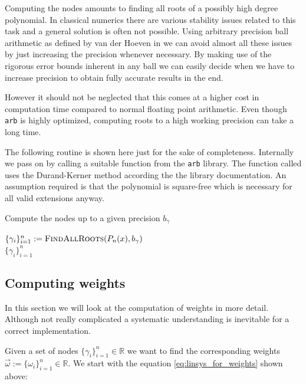 \documentclass[a4paper,10pt]{article}
\begin{document}
Computing the nodes amounts to finding all roots of a possibly high degree
polynomial. In classical numerics there are various stability issues related
to this task and a general solution is often not possible. Using arbitrary precision
ball arithmetic as defined by van der Hoeven in \cite{vdH:ball:greifswald, vdH:ball}
we can avoid almost all these issues by just increasing the precision
whenever necessary. By making use of the rigorous error bounds inherent in any ball
we can easily decide when we have to increase precision to obtain fully accurate
results in the end.

However it should not be neglected that this comes at a higher cost in computation time
compared to normal floating point arithmetic. Even though \texttt{arb} is highly optimized,
computing roots to a high working precision can take a long time.

The following routine is shown here just for the sake of completeness. Internally
we pass on by calling a suitable function from the \texttt{arb} library. The function
called uses the Durand-Kerner method according the the library documentation. An
assumption required is that the polynomial is square-free which is necessary for
all valid extensions anyway.

\begin{algorithm}
  \caption{Compute the nodes up to a given precision $b_{\gamma}$}
  \begin{algorithmic}
    \State $\{\gamma_i\}_{i=1}^{n} := \textsc{FindAllRoots}(P_n(x), b_{\gamma})$ \\
    \Return $\{\gamma_i\}_{i=1}^{n}$
    \EndProcedure
  \end{algorithmic}
\end{algorithm}


\subsection{Computing weights}

In this section we will look at the computation of weights in more detail.
Although not really complicated a systematic understanding is inevitable for
a correct implementation.

Given a set of nodes $\{\gamma_i\}_{i=1}^{n} \in \mathbb{R}$ we want
to find the corresponding weights $\vec{\omega} := \{\omega_i\}_{i=1}^{n} \in \mathbb{R}$.
We start with the equation \eqref{eq:linsys_for_weights} shown above:
\end{document}
